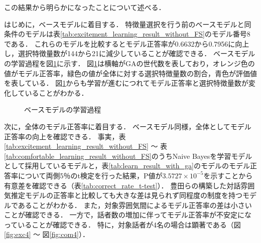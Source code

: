 この結果から明らかになったことについて述べる．

はじめに，ベースモデルに着目する．
特徴量選択を行う前のベースモデルと同条件のモデルは表\ref{tab:excitement_learning_result_without_FS}のモデル番号8である．
これらのモデルを比較するとモデル正答率が0.6632から0.7956に向上し，選択特徴量数が144から21に減少していることが確認できる．
ベースモデルの学習過程を図\ref{fig:exc3_crossover}に示す．
図\ref{fig:exc3_crossover}は横軸がGAの世代数を表しており，オレンジ色の値がモデル正答率，緑色の値が全体に対する選択特徴量数の割合，青色が評価値を表している．
図\ref{fig:exc3_crossover}からも学習が進むにつれてモデル正答率と選択特徴量数が変化していることがわかる．

\begin{figure}
    \centering
    \caption{ベースモデルの学習過程}
    \label{fig:exc3_crossover}
\end{figure}

次に，全体のモデル正答率に着目する．
ベースモデル同様，全体としてモデル正答率の向上を確認できる．
事実，表\ref{tab:excitement_learning_result_without_FS} 〜 表\ref{tab:comfortable_learning_result_without_FS}のうちNaive Bayesを学習モデルとして採用しているモデルと，表\ref{tab:learn_result_with_ga}のモデルのモデル正答率について両側5％のt検定を行った結果，P値が$3.5727 \times 10^{-5}$を示すことから有意差を確認できる（表\ref{tab:correct_rate_t-test}）．
豊田らの構築した対話雰囲気推定モデルの正答率と比較しても大きな差は見られず同程度の制度を持つモデルであることがわかる．
また，対象雰囲気間によるモデル正答率の差は小さいことが確認できる．
一方で，話者数の増加に伴ってモデル正答率が不安定になっていることが確認できる．
特に，対象話者が4名の場合は顕著である（図\ref{fig:exc4} 〜 図\ref{fig:com4}）．

